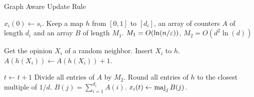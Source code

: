 \begin{algorithm}
  \caption{Graph Aware Update Rule}
  \label{alg:frequencies}
  \begin{algorithmic}[1]
    \State $x_i(0) \gets s_i$.
    \State Keep a map $h$ from $[0,1]$ to $[d_i]$,
    an array of counters $A$ of length $d_i$ and an array $B$ of length
    $M_1$.
    \State $M_1 = O(\ln(n/\varepsilon))$, $M_2 = O(d^2 \ln(d))$


    \State Get the opinion $X_i$ of a random neighbor.
    \State Insert $X_i$ to $h$.
    \Else
    \State $A(h(X_i)) \gets A(h(X_i)) +1$.

  \EndIf
  \State $t \gets t+1$
\EndFor
\State Divide all entries of $A$ by $M_2$.  \label{alg:line:counters}
\State Round all entries of $h$ to the closest multiple of $1/d$.
\State $B(j) = \sum_{i=1}^{d_i} A(i)$.
\EndFor
\State $x_i(t) \gets \operatorname*{maj}_{j} B(j)$.
\EndFor
\end{algorithmic}
\end{algorithm}

